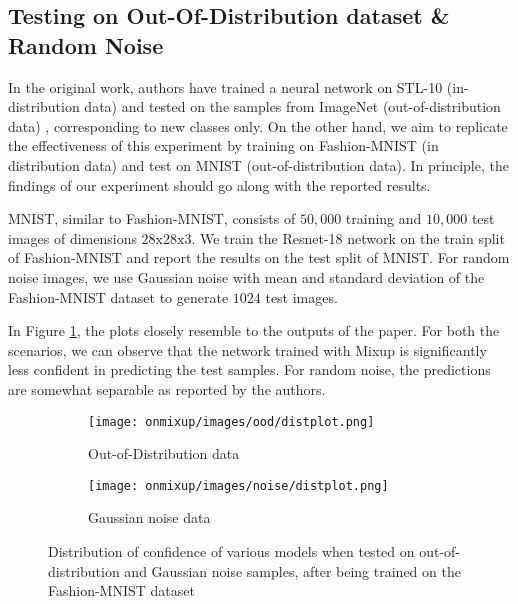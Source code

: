 \documentclass{article}
\begin{document}
\subsection{Testing on Out-Of-Distribution dataset \& Random Noise}
\label{sec:ood}
In the original work, authors have trained a neural network on STL-10 (in-distribution data) and tested on the samples from ImageNet (out-of-distribution data) \cite{imagenet_cvpr09}, corresponding to new classes only. On the other hand, we aim to replicate the effectiveness of this experiment by training on Fashion-MNIST (in distribution data) and test on MNIST (out-of-distribution data). In principle, the findings of our experiment should go along with the reported results.

MNIST, similar to Fashion-MNIST, consists of $50,000$ training and $10,000$ test images of dimensions $28\text{x}28\text{x}3$. We train the Resnet-18 network on the train split of Fashion-MNIST and report the results on the test split of MNIST. For random noise images, we use Gaussian noise with mean and standard deviation of the Fashion-MNIST dataset to generate $1024$ test images. 

In Figure \ref{fig:out_dist}, the plots closely resemble to the outputs of the paper. For both the scenarios, we can observe that the network trained with Mixup is significantly less confident in predicting the test samples. For random noise, the predictions are somewhat separable as reported by the authors. 
\begin{figure}[h]
     \centering
     \begin{subfigure}[b]{0.45\textwidth}
         \centering
         \texttt{[image: onmixup/images/ood/distplot.png]}
         \caption{Out-of-Distribution data}
     \end{subfigure}
     \begin{subfigure}[b]{0.45\textwidth}
         \centering
         \texttt{[image: onmixup/images/noise/distplot.png]}
         \caption{Gaussian noise data}
     \end{subfigure}
        \caption{Distribution of confidence of various models when tested on out-of-distribution and Gaussian noise samples, after being trained on the Fashion-MNIST dataset}
        \label{fig:out_dist}
\end{figure}
\end{document}

